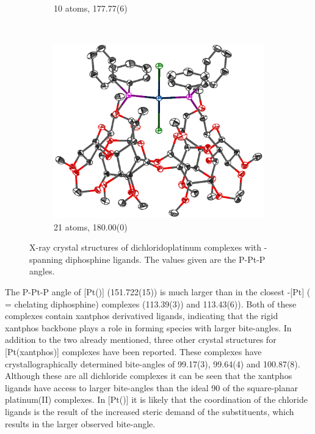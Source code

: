 \begin{figure}[htbp]
\begin{subfigure}[b]{0.32\textwidth}
                \caption{10 atoms, 177.77(6)\degrees{}\cite{Ruhland2007}}
                \label{WIBCIU}
        \end{subfigure}
        ~
        \begin{subfigure}[b]{0.32\textwidth}
                \includegraphics[width=\textwidth]{../Othercrystals/PtCl2/Trans/202109.eps}
                \caption{21 atoms, 180.00(0)\degrees{} \cite{Engeldinger2003}}
                \label{OJUBAW}
        \end{subfigure}
        \caption[X-ray crystal structures of dichloridoplatinum complexes with \trans-spanning diphosphine ligands]{X-ray crystal structures of dichloridoplatinum complexes with \trans-spanning diphosphine ligands.  The values given are the P-Pt-P angles.}
        \label{crystal:transspanning}
        \end{figure}
        
The P-Pt-P angle of [Pt(\tButhixantphos)] (151.722(15)\degrees) is much larger than in the closest \cis{}-[Pt] ( = chelating diphosphine) complexes (113.39(3))\degrees{} and 113.43(6)\degrees{}).  Both of these complexes contain xantphos derivatived ligands, indicating that the rigid xantphos backbone plays a role in forming species with larger bite-angles.\cite{Vlugt2003, Mora2008}  In addition to the two already mentioned, three other crystal structures for [Pt(xantphos)] complexes have been reported.\cite{Duren2006, Duren2007, Niksch2010}  These complexes have crystallographically determined bite-angles of 99.17(3), 99.64(4) and 100.87(8)\degrees.  Although these are all \cis{} dichloride complexes it can be seen that the xantphos ligands have access to larger bite-angles than the ideal 90\degrees{} of the square-planar platinum(II) complexes.  In [Pt(\tButhixantphos)] it is likely that the \trans{} coordination of the chloride ligands is the result of the increased steric demand of the \tBu{} substituents, which results in the larger observed bite-angle.  

